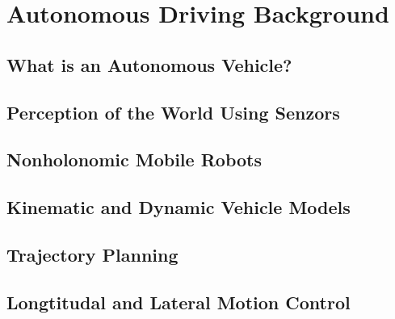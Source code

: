 \chapter{Autonomous Driving Background}

\section{What is an Autonomous Vehicle?}

\section{Perception of the World Using Senzors}

\section{Nonholonomic Mobile Robots}

\section{Kinematic and Dynamic Vehicle Models}

\section{Trajectory Planning}

\section{Longtitudal and Lateral Motion Control}
